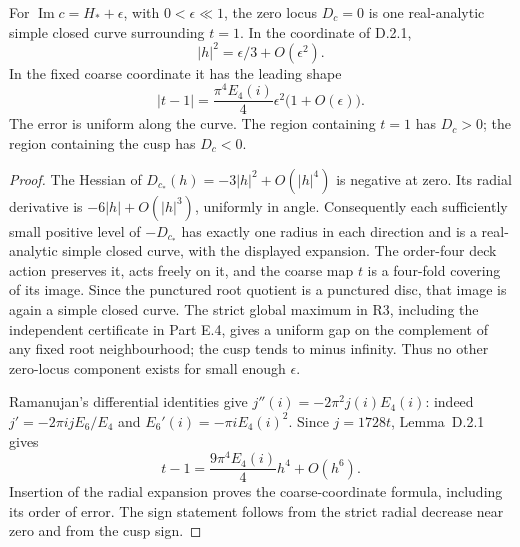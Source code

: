 \begin{proposition}\label{push:src:D.4.1}
For \(\operatorname{Im}c=H_*+\epsilon\), with
\(0<\epsilon\ll1\), the zero locus \(D_c=0\) is one real-analytic
simple closed curve surrounding \(t=1\). In the coordinate of D.2.1,
\[
 |h|^2=\epsilon/3+O(\epsilon^2).
\]
In the fixed coarse coordinate it has the leading shape
\[
 |t-1|=\frac{\pi^4E_4(i)}4\epsilon^2
                         \bigl(1+O(\epsilon)\bigr).
\]
The error is uniform along the curve. The region containing \(t=1\)
has \(D_c>0\); the region containing the cusp has \(D_c<0\).
\end{proposition}
\begin{proof}
The Hessian of \(D_{c_*}(h)=-3|h|^2+O(|h|^4)\) is negative
at zero. Its radial derivative is \(-6|h|+O(|h|^3)\), uniformly
in angle. Consequently each sufficiently small positive level of
\(-D_{c_*}\) has exactly one radius in each direction and is a
real-analytic simple closed curve, with the displayed expansion.
The order-four deck action preserves it, acts freely on it, and the
coarse map \(t\) is a four-fold covering of its image. Since the
punctured root quotient is a punctured disc, that image is again a
simple closed curve. The strict global maximum in R3, including the
independent certificate in Part E.4, gives a uniform gap on the
complement of any fixed root neighbourhood; the cusp tends to minus
infinity. Thus no other zero-locus component exists for small enough
\(\epsilon\).

Ramanujan's differential identities give
\(j''(i)=-2\pi^2j(i)E_4(i)\): indeed
\(j'=-2\pi i jE_6/E_4\) and
\(E_6'(i)=-\pi iE_4(i)^2\). Since \(j=1728t\), Lemma~D.2.1 gives
\[
 t-1=\frac{9\pi^4E_4(i)}4h^4+O(h^6).
\]
Insertion of the radial expansion proves the coarse-coordinate
formula, including its order of error. The sign statement follows
from the strict radial decrease near zero and from the cusp sign.
\end{proof}


